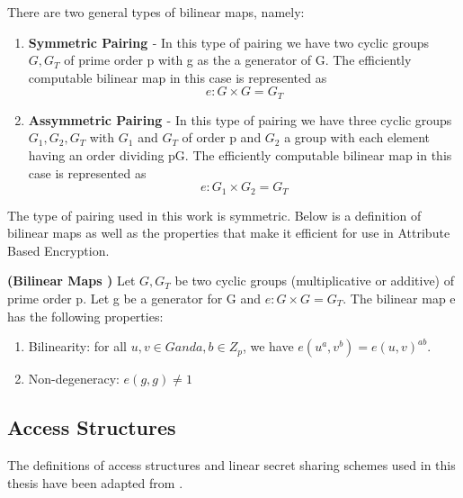There are two general types of bilinear maps, namely:

\begin{enumerate}
	\item \textbf{Symmetric Pairing \cite{Lynn2007}} - In this type of pairing we have two cyclic groups $ G, G_{T} $ of prime order p with g as the a generator of G. The efficiently computable bilinear map in this case is represented as $$ e \colon G \times G = G_{T} $$
	
	\item \textbf{Assymmetric Pairing \cite{Lynn2007}} - In this type of pairing we have three cyclic groups $ G_{1}, G_{2}, G_{T} $ with $ G_{1} $ and $ G_{T} $ of order p and $ G_{2} $ a group with each element having an order dividing pG. The efficiently computable bilinear map in this case is represented as $$ e \colon G_{1} \times G_{2} = G_{T} $$
	
\end{enumerate}

The type of pairing used in this work is symmetric. Below is a definition of bilinear maps as well as the properties that make it efficient for use in Attribute Based Encryption.

\begin{definition}{\textbf{(Bilinear Maps \cite{Lynn2007})}}
	Let $ G, G_{T} $  be two cyclic groups (multiplicative or additive) of prime order p. Let g be a generator for G and  $  e \colon G \times G = G_{T} $. The bilinear map e has the following properties:
	
	\begin{enumerate}
		
		\item Bilinearity: for all $ u, v \in G and a, b \in Z_{p} $, we have $ e(u^{a}, v^{b}) = e(u, v)^{ab} $.
		
		\item Non-degeneracy: $ e(g, g) \neq 1 $
		
	\end{enumerate}
	
\end{definition}

\subsection{Access Structures}

The definitions of access structures and linear secret sharing schemes used in this thesis have been adapted from \cite{Beimel1996}.

